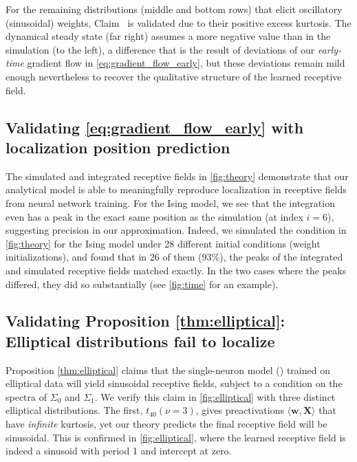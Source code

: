 For the remaining distributions (middle and bottom rows) that elicit oscillatory (sinusoidal) weights, 
Claim~ is validated due to their positive excess kurtosis.
The dynamical steady state (far right) assumes a more negative value than in the simulation (to the left), 
a difference that is the result of deviations of our \emph{early-time} gradient flow in 
\cref{eq:gradient_flow_early}, but these deviations remain mild enough nevertheless to recover the qualitative structure of the learned receptive field.


\subsection{Validating \cref{eq:gradient_flow_early} with localization position prediction}
\label{sec:peak-prediction}
The simulated and integrated receptive fields in \cref{fig:theory} demonstrate that our analytical model is able to meaningfully reproduce localization in receptive fields from neural network training.
For the Ising model, we see that the integration even has a peak in the exact same position as the simulation (at index $i=6$), suggesting precision in our approximation.
Indeed, we simulated the condition in \cref{fig:theory} for the Ising model under 28 different initial conditions (weight initializations), and found that in 26 of them (93\%), the peaks of the integrated and simulated receptive fields matched exactly.
In the two cases where the peaks differed, they did so substantially (see \cref{fig:time} for an example). 

\subsection{Validating Proposition \ref{thm:elliptical}: Elliptical distributions fail to localize}
\label{sec:elliptical-experiments}
Proposition \ref{thm:elliptical} claims that the single-neuron model ()
trained on elliptical data will yield sinusoidal receptive fields, 
subject to a condition on the spectra of $\Sigma_0$ and $\Sigma_1$.
We verify this claim in \cref{fig:elliptical} with three distinct elliptical distributions.
The first, $t_{40}(\nu=3)$, gives preactivations $\langle \mathbf{w}, \mathbf{X} \rangle$ that have \emph{infinite} kurtosis, yet our theory predicts the final receptive field will be sinusoidal.
This is confirmed in \cref{fig:elliptical}, where the learned receptive field is indeed a sinusoid with period 1 and intercept at zero.

